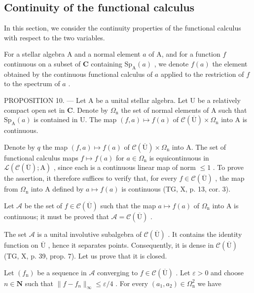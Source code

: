 \subsection{Continuity of the functional calculus}

In this section, we consider the continuity properties of the functional calculus with respect to the two variables.

For a stellar algebra A and a normal element \(a\) of A, and for a function \(f\) continuous on a subset of \(\mathbf{C}\) containing \(\mathrm{Sp}_{\mathrm{A}}(a)\) , we denote \(f(a)\) the element obtained by the continuous functional calculus of \(a\) applied to the restriction of \(f\) to the spectrum of \(a\) .

PROPOSITION 10. --- Let A be a unital stellar algebra. Let U be a relatively compact open set in \(\mathbf{C}\). Denote by \(\Omega_{\mathrm{n}}\) the set of normal elements of A such that \(\mathrm{Sp}_{\mathrm{A}}(a)\) is contained in U. The map \((f,a)\mapsto f(a)\) of \(\mathcal{C}(\overline{\mathrm{U}})\times \Omega_{\mathrm{n}}\) into A is continuous.

Denote by \(q\) the map \((f, a) \mapsto f(a)\) of \(\mathcal{C}(\overline{\mathrm{U}}) \times \Omega_{\mathrm{n}}\) into A. The set of functional calculus maps \(f \mapsto f(a)\) for \(a \in \Omega_{\mathrm{n}}\) is equicontinuous in \(\mathcal{L}(\mathcal{C}(\overline{\mathrm{U}}); \mathrm{A})\) , since each is a continuous linear map of norm \(\leqslant 1\) . To prove the assertion, it therefore suffices to verify that, for every \(f \in \mathcal{C}(\overline{\mathrm{U}})\) , the map from \(\Omega_{\mathrm{n}}\) into A defined by \(a \mapsto f(a)\) is continuous (TG, X, p. 13, cor. 3).

Let \(\mathcal{A}\) be the set of \(f\in\mathcal{C}(\overline{\mathrm{U}})\) such that the map \(a\mapsto f(a)\) of \(\Omega_{\mathrm{n}}\) into A is continuous; it must be proved that \(\mathcal{A}=\mathcal{C}(\overline{\mathrm{U}})\) .

The set \(\mathcal{A}\) is a unital involutive subalgebra of \(\mathcal{C}(\overline{\mathrm{U}})\) . It contains the identity function on \(\overline{\mathrm{U}}\) , hence it separates points. Consequently, it is dense in \(\mathcal{C}(\overline{\mathrm{U}})\) (TG, X, p. 39, prop. 7). Let us prove that it is closed.

Let \((f_{\mathrm{n}})\) be a sequence in \(\mathcal{A}\) converging to \(f \in \mathcal{C}(\overline{\mathrm{U}})\) . Let \(\varepsilon > 0\) and choose \(n \in \mathbf{N}\) such that \(\|f - f_{n}\|_{\infty} \leqslant \varepsilon/4\) . For every \((a_{1}, a_{2}) \in \Omega_{\mathrm{n}}^{2}\) we have

